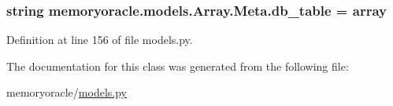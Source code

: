 \subsubsection[{db\+\_\+table}]{\setlength{\rightskip}{0pt plus 5cm}string memoryoracle.\+models.\+Array.\+Meta.\+db\+\_\+table = \textquotesingle{}array\textquotesingle{}\hspace{0.3cm}{\ttfamily [static]}}\label{classmemoryoracle_1_1models_1_1Array_1_1Meta_a9efa9bd2a6907abc7692e196d0055a37}


Definition at line 156 of file models.\+py.



The documentation for this class was generated from the following file\+:\begin{DoxyCompactItemize}
\item 
memoryoracle/\hyperlink{models_8py}{models.\+py}\end{DoxyCompactItemize}
